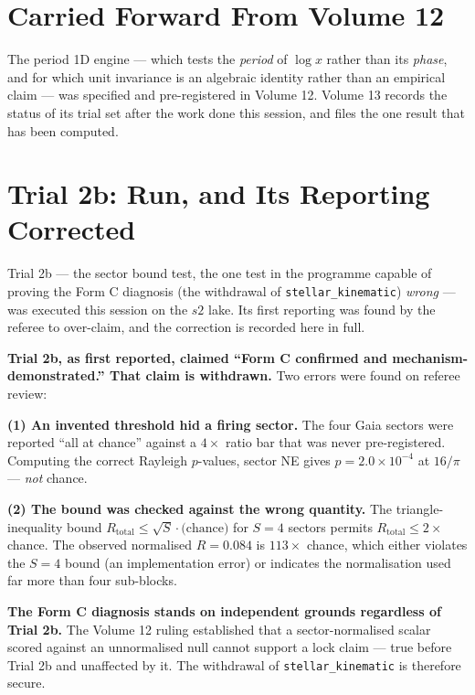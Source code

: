 \documentclass[11pt, letterpaper, openany]{book}
\begin{document}
\section{Carried Forward From Volume 12}

The period 1D engine --- which tests the \emph{period} of $\log x$ rather than its \emph{phase},
and for which unit invariance is an algebraic identity rather than an empirical claim --- was
specified and pre-registered in Volume 12. Volume 13 records the status of its trial set after
the work done this session, and files the one result that has been computed.

\section{Trial 2b: Run, and Its Reporting Corrected}

Trial 2b --- the sector bound test, the one test in the programme capable of proving the Form C
diagnosis (the withdrawal of \texttt{stellar\_kinematic}) \emph{wrong} --- was executed this
session on the $s2$ lake. Its first reporting was found by the referee to over-claim, and the
correction is recorded here in full.

\begin{correctionbox}
\textbf{Trial 2b, as first reported, claimed ``Form C confirmed and mechanism-demonstrated.''
That claim is withdrawn.} Two errors were found on referee review:

\medskip
\textbf{(1) An invented threshold hid a firing sector.} The four Gaia sectors were reported ``all
at chance'' against a $4\times$ ratio bar that was never pre-registered. Computing the correct
Rayleigh $p$-values, sector NE gives $p = 2.0\times10^{-4}$ at $16/\pi$ --- \emph{not} chance. 

\medskip
\textbf{(2) The bound was checked against the wrong quantity.} The triangle-inequality bound
$R_{\mathrm{total}} \leq \sqrt{S}\cdot\text{(chance)}$ for $S=4$ sectors permits
$R_{\mathrm{total}} \leq 2\times$ chance. The observed normalised $R = 0.084$ is $113\times$ chance,
which either violates the $S=4$ bound (an implementation error) or indicates the normalisation used
far more than four sub-blocks. 
\end{correctionbox}

\begin{rulingbox}
\textbf{The Form C diagnosis stands on independent grounds regardless of Trial 2b.} The Volume 12
ruling established that a sector-normalised scalar scored against an unnormalised null cannot
support a lock claim --- true before Trial 2b and unaffected by it. The withdrawal of
\texttt{stellar\_kinematic} is therefore secure. 
\end{rulingbox}
\end{document}

